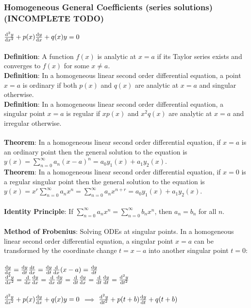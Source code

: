 \documentclass{article}
\begin{document}
			\subsubsection{Homogeneous General Coefficients (series solutions) (INCOMPLETE TODO)}
				$\dv[2]{y}{x} + p(x)\dv{y}{x} + q(x)y = 0$ \\
				\\
				\textbf{Definition}: A function $f(x)$ is analytic at $x = a$ if its Taylor series exists and converges to $f(x)$ for some $x \ne a$. \\
				\textbf{Definition}: In a homogeneous linear second order differential equation, a point $x = a$ is ordinary if both $p(x)$ and $q(x)$ are analytic at $x = a$ and singular otherwise. \\
				\textbf{Definition}: In a homogeneous linear second order differential equation, a singular point $x = a$ is regular if $xp(x)$ and $x^2q(x)$ are analytic at $x = a$ and irregular otherwise. \\
				\\
				\textbf{Theorem}: In a homogeneous linear second order differential equation, if $x = a$ is an ordinary point then the general solution to the equation is $y(x) = \sum_{n=0}^\infty{a_n(x - a)^n} = a_0y_1(x) + a_1y_2(x)$. \\
				\textbf{Theorem}: In a homogeneous linear second order differential equation, if $x = 0$ is a regular singular point then the general solution to the equation is $y(x) = x^r\sum_{n=0}^\infty{a_nx^n} = \sum_{n=0}^\infty{a_nx^{n+r}} = a_0y_1(x) + a_1y_2(x)$. \\
				\\
				\textbf{Identity Principle}: If $\sum_{n=0}^\infty{a_nx^n} = \sum_{n=0}^\infty{b_nx^n}$, then $a_n = b_n$ for all $n$. \\
				\\
				\textbf{Method of Frobenius}: Solving ODEs at singular points. In a homogeneous linear second order differential equation, a singular point $x = a$ can be transformed by the coordinate change $t = x - a$ into another singular point $t = 0$: \\
				\\
				$\dv{y}{x} = \dv{y}{t} \dv{t}{x} = \dv{y}{t} \dv{x}(x-a) = \dv{y}{t}$ \\
				$\dv[2]{y}{x} = \dv{x}\dv{y}{x} = \dv{x}\dv{y}{t} = \dv{t}\dv{y}{x} = \dv{t}\dv{y}{t} = \dv[2]{y}{t}$ \\
				\\
				$\dv[2]{y}{x} + p(x)\dv{y}{x} + q(x)y = 0$ $\implies$ $\dv[2]{y}{t} + p(t + b)\dv{y}{t} + q(t + b)$ \\
\end{document}
